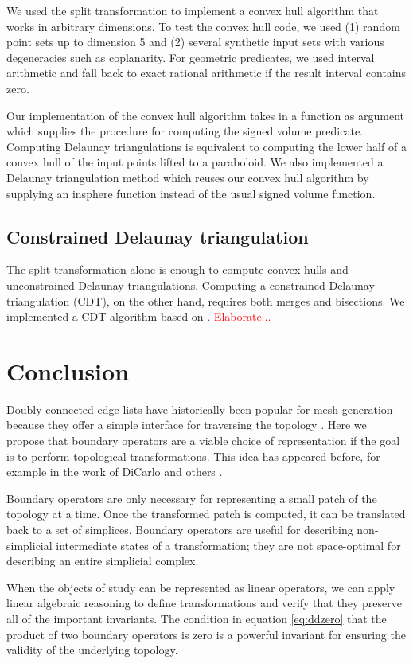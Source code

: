 \documentclass[twocolumn]{article}
\begin{document}
We used the split transformation to implement a convex hull algorithm that works in arbitrary dimensions.
To test the convex hull code, we used (1) random point sets up to dimension 5 and (2) several synthetic input sets with various degeneracies such as coplanarity.
For geometric predicates, we used interval arithmetic and fall back to exact rational arithmetic if the result interval contains zero.

Our implementation of the convex hull algorithm takes in a function as argument which supplies the procedure for computing the signed volume predicate.
Computing Delaunay triangulations is equivalent to computing the lower half of a convex hull of the input points lifted to a paraboloid.
We also implemented a Delaunay triangulation method which reuses our convex hull algorithm by supplying an insphere function instead of the usual signed volume function.

\subsection{Constrained Delaunay triangulation}

The split transformation alone is enough to compute convex hulls and unconstrained Delaunay triangulations.
Computing a constrained Delaunay triangulation (CDT), on the other hand, requires both merges and bisections.
We implemented a CDT algorithm based on \cite{anglada1997improved}.
\textcolor{red}{Elaborate...}


\section{Conclusion}

Doubly-connected edge lists have historically been popular for mesh generation because they offer a simple interface for traversing the topology \cite{guibas1985primitives}.
Here we propose that boundary operators are a viable choice of representation if the goal is to perform topological transformations.
This idea has appeared before, for example in the work of DiCarlo and others \cite{dicarlo2007solid}.

Boundary operators are only necessary for representing a small patch of the topology at a time.
Once the transformed patch is computed, it can be translated back to a set of simplices.
Boundary operators are useful for describing non-simplicial intermediate states of a transformation; they are not space-optimal for describing an entire simplicial complex.

When the objects of study can be represented as linear operators, we can apply linear algebraic reasoning to define transformations and verify that they preserve all of the important invariants.
The condition in equation \eqref{eq:ddzero} that the product of two boundary operators is zero is a powerful invariant for ensuring the validity of the underlying topology.



\end{document}
